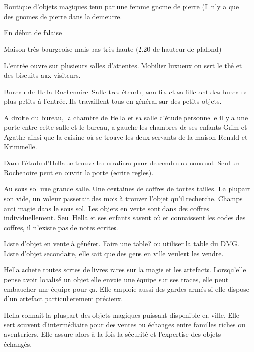 Boutique d'objets magiques tenu par une femme gnome de pierre
(Il n'y a que des gnomes de pierre dans la demeurre.

En début de falaise

Maison très bourgeoise mais pas très haute (2.20 de hauteur de plafond)

L'entrée ouvre sur plusieurs salles d'attentes. Mobilier luxueux on sert 
le thé et des biscuits aux visiteurs.

Bureau de Hella Rochenoire. Salle très étendu, son fils et sa fille ont
des bureaux plus petits à l'entrée. Ils travaillent tous en général sur 
des petits objets. 

A droite du bureau, la chambre de Hella et sa salle d'étude personnelle
il y a une porte entre cette salle et le bureau, a gauche les chambres
de ses enfants Grim et Agathe ainsi que la cuisine où se trouve les deux
servants de la maison Renald et Krimmelle.

Dans l'étude d'Hella se trouve les escaliers pour descendre au sous-sol.
Seul un Rochenoire peut en ouvrir la porte (ecrire regles).

Au sous sol une grande salle. Une centaines de coffres de toutes tailles.
La plupart son vide, un voleur passerait des mois à trouver l'objet 
qu'il recherche. Champs anti magie dans le sous sol. Les objets en vente 
sont dans des coffres individuellement. Seul Hella et ses enfants savent 
où et connaissent les codes des coffres, il n'existe pas de notes ecrites.

Liste d'objet en vente à générer. Faire une table? ou utiliser la table
du DMG. Liste d'objet secondaire, elle sait que des gens en ville veulent 
les vendre.

Hella achete toutes sortes de livres rares sur la magie et les artefacts.
Lorsqu'elle pense avoir localisé un objet elle envoie une équipe sur ses 
traces, elle peut embaucher une équipe pour ça. Elle emploie aussi des
gardes armés si elle dispose d'un artefact particulierement précieux.

Hella connait la pluspart des objets magiques puissant disponible en ville.
Elle sert souvent d'intermédiaire pour des ventes ou échanges entre familles
riches ou aventuriers. Elle assure alors à la fois la sécurité et 
l'expertise des objets échangés. 
